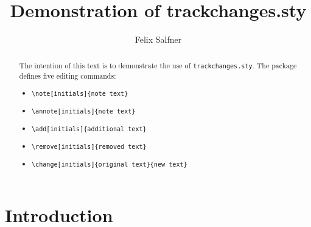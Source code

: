 \documentclass[a4paper,10pt]{article}
\begin{document}
\title{Demonstration of trackchanges.sty}
\author{Felix Salfner}

\maketitle

\begin{abstract} \noindent The intention of this text is to demonstrate the use of \texttt{trackchanges.sty}. The package defines five editing commands:
\begin{itemize}
  \item \begin{verbatim}\note[initials]{note text}\end{verbatim}
  \item \begin{verbatim}\annote[initials]{note text}\end{verbatim}
  \item \begin{verbatim}\add[initials]{additional text}\end{verbatim}
  \item \begin{verbatim}\remove[initials]{removed text}\end{verbatim}
  \item \begin{verbatim}\change[initials]{original text}{new text}\end{verbatim}
\end{itemize}
\end{abstract}

\section{Introduction} 
\end{document}
